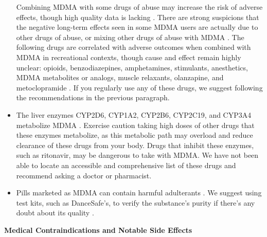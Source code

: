 \documentclass[12pt,letterpaper]{article}
\begin{document}
\begin{itemize}
    Combining MDMA with some drugs of abuse may increase the risk of adverse effects, though high quality data is lacking \cite{papaseitInteractions}. There are strong suspicions that the negative long-term effects seen in some MDMA users are actually due to other drugs of abuse, or mixing other drugs of abuse with MDMA \cite{halpernMormonRavers,passieHistory}. The following drugs are correlated with adverse outcomes when combined with MDMA in recreational contexts, though cause and effect remain highly unclear: opioids, benzodiazepines, amphetamines, stimulants, anesthetics, MDMA metabolites or analogs, muscle relaxants, olanzapine, and metoclopramide \cite{cohenMDMADrugCombinations}. If you regularly use any of these drugs, we suggest following the recommendations in the previous paragraph.
    \item The liver enzymes CYP2D6, CYP1A2, CYP2B6, CYP2C19, and CYP3A4 metabolize MDMA \cite{torreEnzymes,sarparastDrugInteractions}. Exercise caution taking high doses of other drugs that these enzymes metabolize, as this metabolic path may overload and reduce clearance of these drugs from your body. Drugs that inhibit these enzymes, such as ritonavir, may be dangerous to take with MDMA. We have not been able to locate an accessible and comprehensive list of these drugs and recommend asking a doctor or pharmacist.
    \item Pills marketed as MDMA can contain harmful adulterants \cite{saleemiAdulterants}. We suggest using test kits, such as DanceSafe's, to verify the substance's purity if there's any doubt about its quality \cite{danceSafeTestingKit}.
\end{itemize}
\noindent \textbf{Medical Contraindications and Notable Side Effects}
\end{document}
